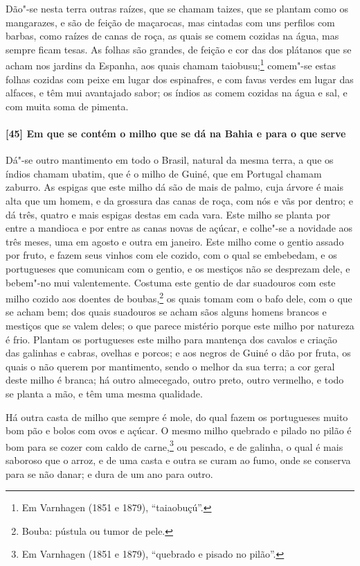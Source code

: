 \begin{linenumbers}
Dão"-se nesta terra outras raízes, que se chamam taizes, que se 
plantam como os mangarazes, e são de feição de maçarocas, mas cintadas com uns
perfilos com barbas, como raízes de canas de roça, as quais se comem cozidas na água, mas
sempre ficam tesas. As folhas são grandes, de feição e cor das dos plátanos que se acham
nos jardins da Espanha, aos quais chamam taiobusu;\footnote{ Em Varnhagen (1851 e 1879),
``taiaobuçú''.} comem"-se estas folhas cozidas com peixe em lugar dos espinafres, e com
favas verdes em lugar das alfaces, e têm mui avantajado sabor; os índios as comem cozidas
na água e sal, e com muita soma de pimenta.

\paragraph{[45] Em que se contém o milho que se dá na Bahia e para o que serve}\quad
Dá"-se outro mantimento em todo o Brasil, natural da mesma terra, a que os índios chamam
ubatim, que é o milho de Guiné, que em Portugal chamam zaburro. As espigas que este milho
dá são de mais de palmo, cuja árvore é mais alta que um homem, e da grossura das canas de
roça, com nós e vãs por dentro; e dá três, quatro e mais espigas destas em cada vara. Este
milho se planta por entre a mandioca e por entre as canas novas de açúcar, e colhe"-se a
novidade aos três meses, uma em agosto e outra em janeiro. Este milho come o gentio assado
por fruto, e fazem seus vinhos com ele cozido, com o qual se embebedam, e os portugueses
que comunicam com o gentio, e os mestiços não se desprezam dele, e bebem"-no mui
valentemente. Costuma este gentio de dar suadouros com este milho cozido aos doentes de
boubas,\footnote{ Bouba: pústula ou tumor de
pele.} os quais tomam com o bafo dele, com o que se acham bem;
dos quais suadouros se acham sãos alguns homens brancos e mestiços que se valem deles; o
que parece mistério porque este milho por natureza é frio. Plantam os portugueses este
milho para mantença dos cavalos e criação das galinhas e cabras, ovelhas e porcos; e aos
negros de Guiné o dão por fruta, os quais o não querem por mantimento, sendo o melhor da
sua terra; a cor geral deste milho é branca; há outro almecegado, outro preto, outro
vermelho, e todo se planta a mão, e têm uma mesma qualidade.

Há outra casta de milho que sempre é mole, do qual fazem os portugueses muito bom pão e
bolos com ovos e açúcar. O mesmo milho quebrado e pilado no pilão é bom para se cozer com
caldo de carne,\footnote{ Em Varnhagen (1851 e 1879), ``quebrado e pisado no pilão''.} ou
pescado, e de galinha, o qual é mais saboroso que o arroz, e de uma casta e outra se curam
ao fumo, onde se conserva para se não danar; e dura de um ano para outro.


\end{linenumbers}
